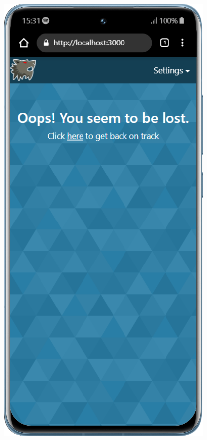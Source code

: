 \begin{figure}[H]
    \centering
    \begin{minipage}{0.25\textwidth}
        \centering
        \includegraphics[width=0.95\textwidth]{img/screen/mobile/404_mobile.png}

\end{minipage}
\end{figure}
